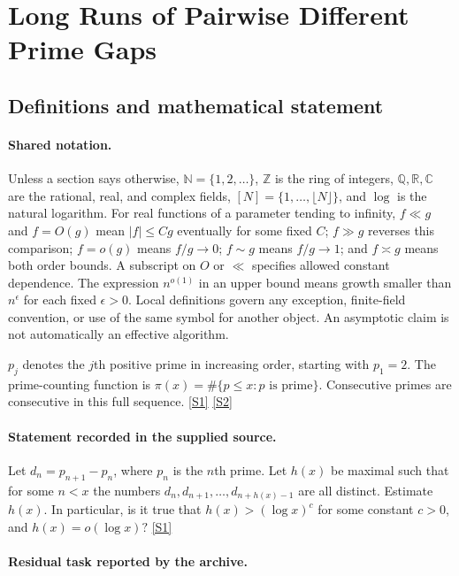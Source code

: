 \documentclass[11pt,a4paper]{article}
\newcommand{\N}{\mathbb{N}}
\newcommand{\Z}{\mathbb{Z}}
\newcommand{\Q}{\mathbb{Q}}
\newcommand{\R}{\mathbb{R}}
\newcommand{\C}{\mathbb{C}}
\newcommand{\sref}[2]{\hyperlink{source:#1:#2}{[S#2]}}
\begin{document}
\section{Long Runs of Pairwise Different Prime Gaps}\label{statement}


\subsection{Definitions and mathematical statement}

\paragraph{Shared notation.}Unless a section says otherwise, $\N=\{1,2,\ldots\}$,
$\Z$ is the ring of integers, $\Q,\R,\C$ are the rational, real, and complex
fields, $[N]=\{1,\ldots,\lfloor N\rfloor\}$, and $\log$ is the natural
logarithm. For real functions of a parameter tending to infinity,
$f\ll g$ and $f=O(g)$ mean $|f|\leq Cg$ eventually for some fixed $C$;
$f\gg g$ reverses this comparison; $f=o(g)$ means $f/g\to0$;
$f\sim g$ means $f/g\to1$; and $f\asymp g$ means both order bounds.
A subscript on $O$ or $\ll$ specifies allowed constant dependence.
The expression $n^{o(1)}$ in an upper bound means growth smaller than
$n^\epsilon$ for each fixed $\epsilon>0$. Local definitions govern any
exception, finite-field convention, or use of the same symbol for another
object. An asymptotic claim is not automatically an effective algorithm.



$p_j$ denotes the $j$th positive prime in increasing order, starting with $p_1=2$. The prime-counting function is $\pi(x)=\#\{p\leq x:p\text{ is prime}\}$. Consecutive primes are consecutive in this full sequence. \sref{statement}{1} \sref{statement}{2}

\paragraph{Statement recorded in the supplied source.}
Let $d_n=p_{n+1}-p_n$, where $p_n$ is the $n$th prime. Let $h(x)$ be maximal such that for some $n<x$ the numbers $d_n,d_{n+1},\ldots,d_{n+h(x)-1}$ are all distinct. Estimate $h(x)$. In particular, is it true that $ h(x) >(\log x)^c $ for some constant $c>0$, and $ h(x)=o(\log x)? $ \sref{statement}{1}

\paragraph{Residual task reported by the archive.}
\end{document}
